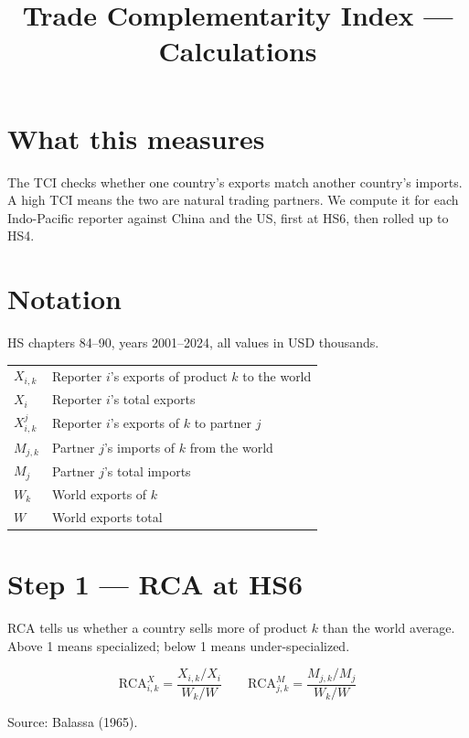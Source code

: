 \documentclass[11pt,a4paper]{article}
\title{\vspace{-2em}Trade Complementarity Index --- Calculations}
\author{}\date{}
\begin{document}
\maketitle\vspace{-2em}

\section*{What this measures}
The TCI checks whether one country's exports match another country's imports. A high TCI means the two are natural trading partners. We compute it for each Indo-Pacific reporter against China and the US, first at HS6, then rolled up to HS4.

\section*{Notation}
HS chapters 84--90, years 2001--2024, all values in USD thousands.

\begin{center}\small
\begin{tabular}{ll}
\toprule
$X_{i,k}$ & Reporter $i$'s exports of product $k$ to the world \\
$X_{i}$   & Reporter $i$'s total exports \\
$X_{i,k}^{j}$ & Reporter $i$'s exports of $k$ to partner $j$ \\
$M_{j,k}$ & Partner $j$'s imports of $k$ from the world \\
$M_{j}$   & Partner $j$'s total imports \\
$W_{k}$   & World exports of $k$ \\
$W$       & World exports total \\
\bottomrule
\end{tabular}
\end{center}

\section*{Step 1 --- RCA at HS6}
RCA tells us whether a country sells more of product $k$ than the world average. Above 1 means specialized; below 1 means under-specialized.

\begin{equation*}
\mathrm{RCA}^{X}_{i,k} = \frac{X_{i,k}/X_{i}}{W_{k}/W}
\qquad
\mathrm{RCA}^{M}_{j,k} = \frac{M_{j,k}/M_{j}}{W_{k}/W}
\end{equation*}

Source: Balassa (1965).
\end{document}
